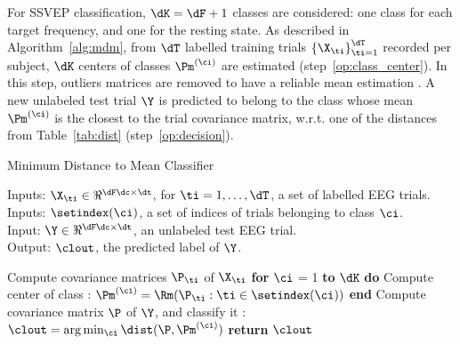 For SSVEP classification, $\dK = \dF + 1$ classes are considered: one class for each target frequency, and one for the resting state.
As described in Algorithm~\ref{alg:mdm}, from $\dT$ labelled training trials $ \left\{ \X_{\ti} \right\}_{\ti=1}^{\dT}$ recorded per subject, $\dK$ centers of classes $\Pm^{(\ci)}$ are estimated (step~\ref{op:class_center}). 
In this step, outliers matrices are removed to have a reliable mean estimation \cite{barachant2013riemannian}.
A new unlabeled test trial $\Y$ is predicted to belong to the class whose mean $\Pm^{(\ci)}$ is the closest to the trial covariance matrix, w.r.t. one of the distances from Table~\ref{tab:dist} (step~\ref{op:decision}).

\begin{algorithm}
\caption{Minimum Distance to Mean Classifier}
\label{alg:mdm}
	Inputs: $\X_{\ti} \in \Re^{\dF \dc\times\dt}$, for $\ti = 1, \ldots, \dT$, a set of labelled EEG trials. \\
	Inputs: $\setindex(\ci)$, a set of indices of trials belonging to class $\ci$. \\
	Input: $\Y \in \Re^{\dF \dc\times\dt}$, an unlabeled test EEG trial. \\
	Output: $\clout$, the predicted label of $\Y$.
	\begin{algorithmic}[1]
	\State Compute covariance matrices $\P_{\ti}$ of $\X_\ti$ 
	\State \textbf{for} $\ci$ = 1 \textbf{to} $\dK$ \textbf{do}
	\State \quad Compute center of class : $\Pm^{(\ci)}=\Rm(\P_{\ti}:\ti \in \setindex(\ci))$
	\label{op:class_center}
	\State \textbf{end}
	\State Compute covariance matrix $\P$ of $\Y$, and classify it : $\clout = \arg \min_{\ci} \dist(\P, \Pm^{(\ci)})$
	\label{op:decision}
	\State \textbf{return} $\clout$
	\end{algorithmic}
\end{algorithm}




